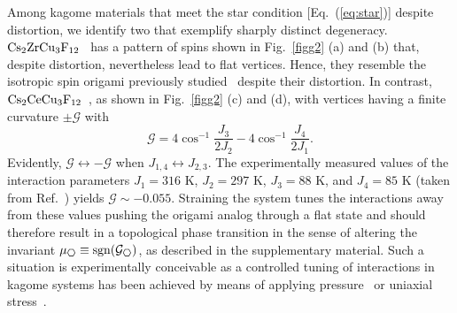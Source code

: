 \documentclass[a4paper,aps,prl,twocolumn,floatfix,showpacs,superscriptaddress]{revtex4-1}
\begin{document}
Among kagome materials that meet the star condition [Eq.~(\ref{eq:star})] despite distortion, we identify two that exemplify sharply distinct degeneracy. ${\rm Cs}_2{\rm ZrCu}_3{\rm F}_{12}$~\cite{ono2009magnetic, downie2014structural} has a pattern of spins shown in Fig.~\ref{figg2} (a) and (b) that, despite distortion, nevertheless lead to flat vertices. Hence, they resemble the isotropic spin origami previously studied~\cite{shender1993kagome,chandra1993anisotropic} despite their distortion. In contrast, ${\rm Cs}_2{\rm CeCu}_3{\rm F}_{12}$~\cite{amemiya2009partial}, as shown in Fig.~\ref{figg2} (c) and (d), 
with vertices having a finite curvature $\pm\mathcal{G}$ with
\begin{equation}
 \mathcal{G} = 4\cos^{-1}\frac{J_3}{2J_2} - 4\cos^{-1}\frac{J_4}{2J_1}.
\end{equation}
Evidently, $\mathcal{G}\leftrightarrow-\mathcal{G}$ when $J_{1,4}\leftrightarrow J_{2,3}$. The experimentally measured values of the interaction parameters $J_1=316$ K, $J_2=297$ K, $J_3=88$ K, and $J_4=85$ K (taken from Ref.~\cite{amemiya2009partial}) yields $\mathcal{G}\sim-0.055$. Straining the system tunes the interactions away from these values pushing the origami analog through a flat state and should therefore result in a topological phase transition in the sense of altering the invariant $\mu_{\hexagon}\equiv\rm{sgn}(\mathcal{G}_{\hexagon})$, as described in the supplementary material. Such a situation is experimentally conceivable as a controlled tuning of interactions in kagome systems has been achieved by means of applying pressure~\cite{wang2012pressure} or uniaxial stress~\cite{kuchler2017uniaxial}.
\end{document}
